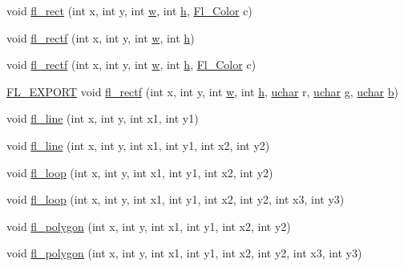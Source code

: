 \begin{DoxyCompactItemize}
\item 
void \hyperlink{group__fl__drawings_gae09f4c1d37871f3530229ede20631d1e}{fl\+\_\+rect} (int x, int y, int \hyperlink{forms_8_h_aac374e320caaadeca4874add33b62af2}{w}, int \hyperlink{forms_8_h_a7e427ba5b307f9068129699250690066}{h}, \hyperlink{_enumerations_8_h_a8b762953646f8abee866061f1af78a6a}{Fl\+\_\+\+Color} c)
\item 
void \hyperlink{group__fl__drawings_ga2986a868e9cc8d9141acde94c0fe8ab0}{fl\+\_\+rectf} (int x, int y, int \hyperlink{forms_8_h_aac374e320caaadeca4874add33b62af2}{w}, int \hyperlink{forms_8_h_a7e427ba5b307f9068129699250690066}{h})
\item 
void \hyperlink{group__fl__drawings_gafa5637e67e69fd6ebfc471619d856dab}{fl\+\_\+rectf} (int x, int y, int \hyperlink{forms_8_h_aac374e320caaadeca4874add33b62af2}{w}, int \hyperlink{forms_8_h_a7e427ba5b307f9068129699250690066}{h}, \hyperlink{_enumerations_8_h_a8b762953646f8abee866061f1af78a6a}{Fl\+\_\+\+Color} c)
\item 
\hyperlink{_fl___export_8_h_aa9ba29a18aee9d738370a06eeb4470fc}{F\+L\+\_\+\+E\+X\+P\+O\+RT} void \hyperlink{group__fl__drawings_ga5ef1c09ef349f5fe128536c8434d514d}{fl\+\_\+rectf} (int x, int y, int \hyperlink{forms_8_h_aac374e320caaadeca4874add33b62af2}{w}, int \hyperlink{forms_8_h_a7e427ba5b307f9068129699250690066}{h}, \hyperlink{fl__types_8h_a65f85814a8290f9797005d3b28e7e5fc}{uchar} r, \hyperlink{fl__types_8h_a65f85814a8290f9797005d3b28e7e5fc}{uchar} g, \hyperlink{fl__types_8h_a65f85814a8290f9797005d3b28e7e5fc}{uchar} \hyperlink{forms_8_h_a0ba06a290a384fa06b1b90745827dae2}{b})
\item 
void \hyperlink{group__fl__drawings_gaecc374f163a97ef67c4e58be11c47047}{fl\+\_\+line} (int x, int y, int x1, int y1)
\item 
void \hyperlink{group__fl__drawings_ga28cc7813255d063edbd116d51c55fb31}{fl\+\_\+line} (int x, int y, int x1, int y1, int x2, int y2)
\item 
void \hyperlink{group__fl__drawings_ga8043345daebed15378180c5c117930c8}{fl\+\_\+loop} (int x, int y, int x1, int y1, int x2, int y2)
\item 
void \hyperlink{group__fl__drawings_ga0670c9917da81b4fe67da44fd4fb4ab7}{fl\+\_\+loop} (int x, int y, int x1, int y1, int x2, int y2, int x3, int y3)
\item 
void \hyperlink{group__fl__drawings_ga821e9db88f1ff6a8d348c80babd7b49c}{fl\+\_\+polygon} (int x, int y, int x1, int y1, int x2, int y2)
\item 
void \hyperlink{group__fl__drawings_gab14ee2f4c5371ab6fe52bf08569e05d9}{fl\+\_\+polygon} (int x, int y, int x1, int y1, int x2, int y2, int x3, int y3)

\end{DoxyCompactItemize}
